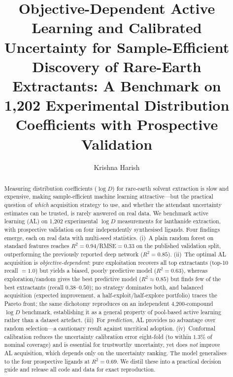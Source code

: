 \documentclass[journal=jcisd8,manuscript=article]{achemso}
\author{Krishna Harish}
\affiliation{Lawrence E. Elkins High School, Missouri City, Texas, USA}
\title{Objective-Dependent Active Learning and Calibrated Uncertainty for
Sample-Efficient Discovery of Rare-Earth Extractants: A Benchmark on 1{,}202
Experimental Distribution Coefficients with Prospective Validation}
\begin{document}
\begin{abstract}
Measuring distribution coefficients ($\log D$) for rare-earth solvent extraction is
slow and expensive, making sample-efficient machine learning attractive---but the
practical question of \emph{which} acquisition strategy to use, and whether the
attendant uncertainty estimates can be trusted, is rarely answered on real data. We
benchmark active learning (AL) on 1{,}202 experimental $\log D$ measurements for
lanthanide extraction, with prospective validation on four independently
synthesised ligands. Four findings emerge, each on real data with multi-seed
statistics. (i)~A plain random forest on standard features reaches
$R^2=0.94$/RMSE$=0.33$ on the published validation split, outperforming the
previously reported deep network ($R^2=0.85$). (ii)~The optimal AL acquisition is
\emph{objective-dependent}: pure exploitation recovers all top extractants
(top-10 recall $=1.0$) but yields a biased, poorly predictive model
($R^2=0.63$), whereas exploration/random gives the best predictive model
($R^2\approx0.85$) but finds few of the best extractants (recall $0.38$--$0.50$);
no strategy dominates both, and balanced acquisition (expected improvement, a
half-exploit/half-explore portfolio) traces the Pareto front; the same dichotomy
reproduces on an independent 4{,}200-compound $\log D$ benchmark, establishing it as
a general property of pool-based active learning rather than a dataset artefact. (iii)~For
\emph{prediction}, AL provides no advantage over random selection---a cautionary
result against uncritical adoption. (iv)~Conformal calibration reduces the
uncertainty calibration error eight-fold (to within $1.3\%$ of nominal coverage)
and is essential for trustworthy uncertainty, yet does \emph{not} improve AL
acquisition, which depends only on the uncertainty ranking. The model generalises
to the four prospective ligands at $R^2=0.69$. We distil these into a practical
decision guide and release all code and data for exact reproduction.
\end{abstract}
\end{document}

